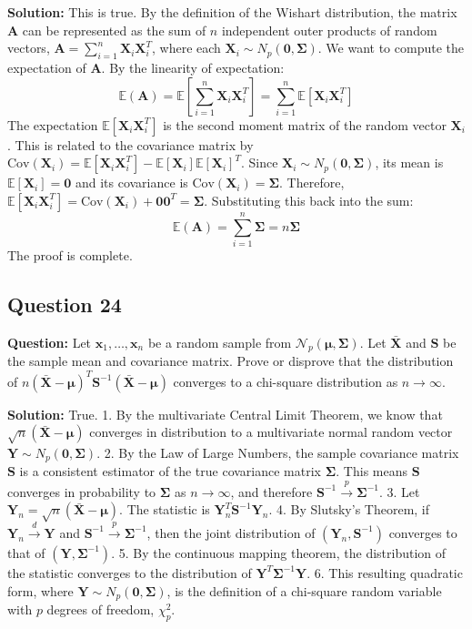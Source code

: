 \textbf{Solution:}
This is true.
By the definition of the Wishart distribution, the matrix $\mathbf{A}$ can be represented as the sum of $n$ independent outer products of random vectors, $\mathbf{A} = \sum_{i=1}^n \mathbf{X}_i \mathbf{X}_i^T$, where each $\mathbf{X}_i \sim N_p(\mathbf{0}, \boldsymbol{\Sigma})$.
We want to compute the expectation of $\mathbf{A}$. By the linearity of expectation:
$$ \mathbb{E}(\mathbf{A}) = \mathbb{E}\left[\sum_{i=1}^n \mathbf{X}_i \mathbf{X}_i^T\right] = \sum_{i=1}^n \mathbb{E}[\mathbf{X}_i \mathbf{X}_i^T] $$
The expectation $\mathbb{E}[\mathbf{X}_i \mathbf{X}_i^T]$ is the second moment matrix of the random vector $\mathbf{X}_i$. This is related to the covariance matrix by $\text{Cov}(\mathbf{X}_i) = \mathbb{E}[\mathbf{X}_i \mathbf{X}_i^T] - \mathbb{E}[\mathbf{X}_i]\mathbb{E}[\mathbf{X}_i]^T$.
Since $\mathbf{X}_i \sim N_p(\mathbf{0}, \boldsymbol{\Sigma})$, its mean is $\mathbb{E}[\mathbf{X}_i] = \mathbf{0}$ and its covariance is $\text{Cov}(\mathbf{X}_i) = \boldsymbol{\Sigma}$.
Therefore, $\mathbb{E}[\mathbf{X}_i \mathbf{X}_i^T] = \text{Cov}(\mathbf{X}_i) + \mathbf{0}\mathbf{0}^T = \boldsymbol{\Sigma}$.
Substituting this back into the sum:
$$ \mathbb{E}(\mathbf{A}) = \sum_{i=1}^n \boldsymbol{\Sigma} = n\boldsymbol{\Sigma} $$
The proof is complete.

\subsection*{Question 24}
\textbf{Question:} Let $\mathbf{x}_1, \dots, \mathbf{x}_n$ be a random sample from $\mathcal{N}_p(\boldsymbol{\mu}, \boldsymbol{\Sigma})$. Let $\bar{\mathbf{X}}$ and $\mathbf{S}$ be the sample mean and covariance matrix. Prove or disprove that the distribution of $n(\bar{\mathbf{X}} - \boldsymbol{\mu})^T \mathbf{S}^{-1} (\bar{\mathbf{X}} - \boldsymbol{\mu})$ converges to a chi-square distribution as $n \to \infty$.

\textbf{Solution:}
True.
1.  By the multivariate Central Limit Theorem, we know that $\sqrt{n}(\bar{\mathbf{X}} - \boldsymbol{\mu})$ converges in distribution to a multivariate normal random vector $\mathbf{Y} \sim N_p(\mathbf{0}, \boldsymbol{\Sigma})$.
2.  By the Law of Large Numbers, the sample covariance matrix $\mathbf{S}$ is a consistent estimator of the true covariance matrix $\boldsymbol{\Sigma}$. This means $\mathbf{S}$ converges in probability to $\boldsymbol{\Sigma}$ as $n \to \infty$, and therefore $\mathbf{S}^{-1} \xrightarrow{p} \boldsymbol{\Sigma}^{-1}$.
3.  Let $\mathbf{Y}_n = \sqrt{n}(\bar{\mathbf{X}} - \boldsymbol{\mu})$. The statistic is $\mathbf{Y}_n^T \mathbf{S}^{-1} \mathbf{Y}_n$.
4.  By Slutsky's Theorem, if $\mathbf{Y}_n \xrightarrow{d} \mathbf{Y}$ and $\mathbf{S}^{-1} \xrightarrow{p} \boldsymbol{\Sigma}^{-1}$, then the joint distribution of $(\mathbf{Y}_n, \mathbf{S}^{-1})$ converges to that of $(\mathbf{Y}, \boldsymbol{\Sigma}^{-1})$.
5.  By the continuous mapping theorem, the distribution of the statistic converges to the distribution of $\mathbf{Y}^T \boldsymbol{\Sigma}^{-1} \mathbf{Y}$.
6.  This resulting quadratic form, where $\mathbf{Y} \sim N_p(\mathbf{0}, \boldsymbol{\Sigma})$, is the definition of a chi-square random variable with $p$ degrees of freedom, $\chi^2_p$.

